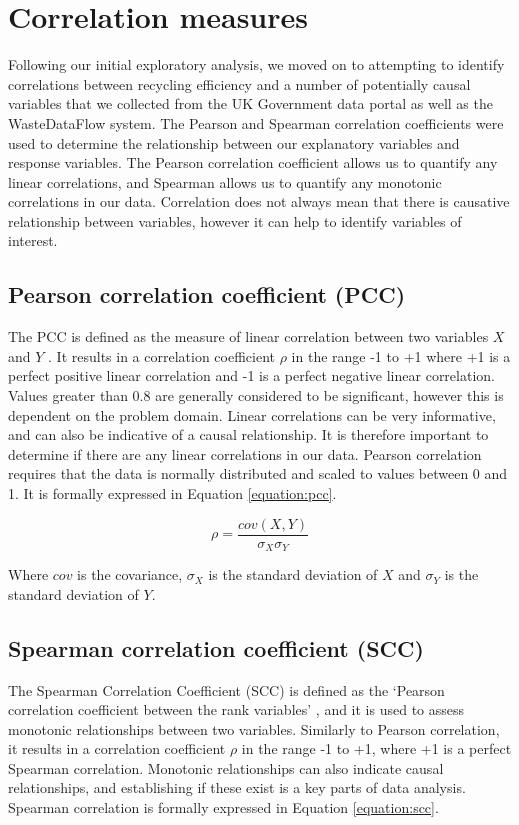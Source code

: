 \documentclass[11pt,conference]{IEEEtran}
\begin{document}
\section{Correlation measures}
Following our initial exploratory analysis, we moved on to attempting to identify correlations between recycling efficiency and a number of potentially causal variables that we collected from the UK Government data portal as well as the WasteDataFlow system. The Pearson and Spearman correlation coefficients were used to determine the relationship between our explanatory variables and response variables. The Pearson correlation coefficient allows us to quantify any linear correlations, and Spearman allows us to quantify any monotonic correlations in our data. Correlation does not always mean that there is causative relationship between variables, however it can help to identify variables of interest. 
\subsection{Pearson correlation coefficient (PCC)}
The PCC is defined as the measure of linear correlation between two variables $X$ and $Y$ \cite{ROUSSEAU201867}. It results in a correlation coefficient $\rho$ in the range -1 to +1 where +1 is a perfect positive linear correlation and -1 is a perfect negative linear correlation. Values greater than 0.8 are generally considered to be significant, however this is dependent on the problem domain. Linear correlations can be very informative, and can also be indicative of a causal relationship. It is therefore important to determine if there are any linear correlations in our data. Pearson correlation requires that the data is normally distributed and scaled to values between 0 and 1.  It is formally expressed in Equation \ref{equation:pcc}.

\begin{equation}
\rho = \frac{cov(X,Y)}{\sigma_{X}\sigma_{Y}}
\label{equation:pcc}
\end{equation}

Where $cov$ is the covariance, $\sigma_{X}$ is the standard deviation of $X$ and $\sigma_{Y}$ is the standard deviation of $Y$.

\subsection{Spearman correlation coefficient (SCC)}
The Spearman Correlation Coefficient (SCC) is defined as the ‘Pearson correlation coefficient between the rank variables’ \cite{ROUSSEAU201867}, and it is used to assess monotonic relationships between two variables. Similarly to Pearson correlation, it results in a correlation coefficient $\rho$ in the range -1 to +1, where +1 is a perfect Spearman correlation. Monotonic relationships can also indicate causal relationships, and establishing if these exist is a key parts of data analysis. Spearman correlation is formally expressed in Equation \ref{equation:scc}.
\end{document}
